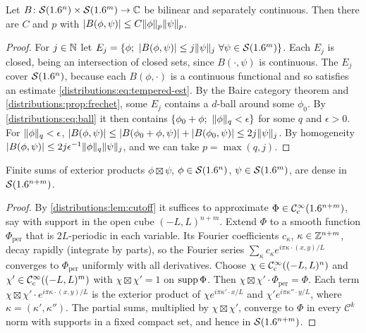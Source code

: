 \begin{lemma}\label{distributions:lem:joint}
Let $B\colon\mathcal{S}(1.6^n)\times\mathcal{S}(1.6^m)\to\mathbb{C}$ be bilinear and separately continuous. Then
there are $C$ and $p$ with $|B(\phi,\psi)|\le C\lVert \phi\rVert_p\lVert \psi\rVert_p$.
\end{lemma}
\begin{proof}
For $j\in\mathbb{N}$ let
$E_j=\{\phi;\ |B(\phi,\psi)|\le j\lVert \psi\rVert_j\ \forall\psi\in\mathcal{S}(1.6^m)\}$. Each $E_j$ is
closed, being an intersection of closed sets, since $B(\cdot,\psi)$ is continuous. The
$E_j$ cover $\mathcal{S}(1.6^n)$, because each $B(\phi,\cdot)$ is a continuous functional and so
satisfies an estimate \eqref{distributions:eq:tempered-est}. By the Baire category
theorem and \cref{distributions:prop:frechet}, some $E_j$ contains a $d$-ball around
some $\phi_0$. By \eqref{distributions:eq:ball} it then contains
$\{\phi_0+\phi;\ \norm{\phi}_q<\epsilon\}$ for some $q$ and $\epsilon>0$. For
$\lVert \phi\rVert_q<\epsilon$,
$|B(\phi,\psi)|\le|B(\phi_0+\phi,\psi)|+|B(\phi_0,\psi)|\le2j\lVert \psi\rVert_j$. By
homogeneity $|B(\phi,\psi)|\le2j\epsilon^{-1}\lVert \phi\rVert_q\lVert \psi\rVert_j$, and we can take
$p=\max(q,j)$.
\end{proof}

\begin{lemma}\label{distributions:lem:tensor-dense}
Finite sums of exterior products $\phi\boxtimes\psi$, $\phi\in\mathcal{S}(1.6^n)$,
$\psi\in\mathcal{S}(1.6^m)$, are dense in $\mathcal{S}(1.6^{n+m})$.
\end{lemma}
\begin{proof}
By \cref{distributions:lem:cutoff} it suffices to approximate
$\Phi\in\mathcal{C}^\infty_{\mathrm{c}}(1.6^{n+m})$, say with support in the open cube $(-L,L)^{n+m}$. Extend $\Phi$
to a smooth function $\Phi_{\mathrm{per}}$ that is $2L$-periodic in each variable. Its
Fourier coefficients $c_\kappa$, $\kappa\in\mathbb{Z}^{n+m}$, decay rapidly (integrate by
parts), so the Fourier series
$\sum_\kappa c_\kappa e^{i\pi\kappa\cdot(x,y)/L}$ converges to $\Phi_{\mathrm{per}}$
uniformly with all derivatives. Choose $\chi\in\mathcal{C}^\infty_{\mathrm{c}}((-L,L)^n)$ and
$\chi'\in\mathcal{C}^\infty_{\mathrm{c}}((-L,L)^m)$ with $\chi\boxtimes\chi'=1$ on $\operatorname{supp}\Phi$. Then
$\chi\boxtimes\chi'\cdot\Phi_{\mathrm{per}}=\Phi$. Each term
$\chi\boxtimes\chi'\cdot e^{i\pi\kappa\cdot(x,y)/L}$ is the exterior product of
$\chi e^{i\pi\kappa'\cdot x/L}$ and $\chi'e^{i\pi\kappa''\cdot y/L}$, where
$\kappa=(\kappa',\kappa'')$. The partial sums, multiplied by $\chi\boxtimes\chi'$,
converge to $\Phi$ in every $\mathcal{C}^k$ norm with supports in a fixed compact set,
and hence in $\mathcal{S}(1.6^{n+m})$.
\end{proof}

